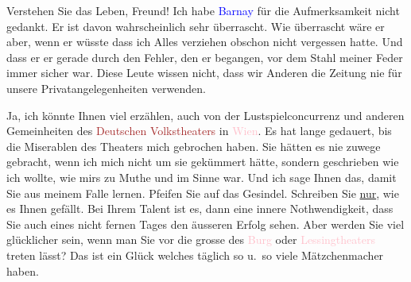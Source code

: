 \pstart
           Verstehen Sie das Leben, Freund! Ich habe \textcolor{blue}{Barnay}\ledrightnote{\textcolor{blue}{Ludwig Barnay}} für die Aufmerksamkeit nicht gedankt. Er ist davon wahrscheinlich
               sehr überrascht. Wie überrascht wäre er aber, wenn er wüsste dass ich Alles verziehen
                   obschon nicht vergessen hatte. Und dass er er
               gerade durch den Fehler, den er begangen, vor dem Stahl meiner Feder immer sicher
               war. Diese Leute wissen nicht, dass wir Anderen die Zeitung nie für unsere
               Privatangelegenheiten verwenden.\pend
           
\pstart
           Ja, ich könnte Ihnen viel erzählen, auch von der Lustspielconcurrenz und anderen
               Gemeinheiten des \textcolor{brown}{Deutschen Volkstheaters}\ledrightnote{\textcolor{brown}{Volkstheater}} in \textcolor{pink}{Wien}\ledrightnote{\textcolor{pink}{Wien}}.  Es hat lange gedauert, bis die Miserablen des {\pb}Theaters mich gebrochen haben. Sie hätten
               es nie zuwege gebracht, wenn ich mich nicht um sie gekümmert hätte, sondern
               geschrieben wie ich wollte, wie mirs zu Muthe und im Sinne war. Und ich sage Ihnen
               das, damit Sie aus meinem Falle lernen. Pfeifen Sie auf das Gesindel. Schreiben Sie
                  \uline{nur}, wie es Ihnen gefällt. Bei Ihrem Talent ist
               es, dann eine innere Nothwendigkeit, dass Sie auch eines nicht fernen Tages den
               äusseren Erfolg sehen. Aber werden Sie viel glücklicher sein, wenn man Sie  vor die grosse \label{K_L03830-16v}\label{K_L03830-16} des \textcolor{pink}{Burg}\ledrightnote{\textcolor{pink}{Burgtheater}} oder \textcolor{pink}{Lessingtheaters}\ledrightnote{\textcolor{pink}{Lessing-Theater}} treten lässt? Das ist ein Glück welches täglich so u. so
               viele Mätzchenmacher haben.\pend
           
